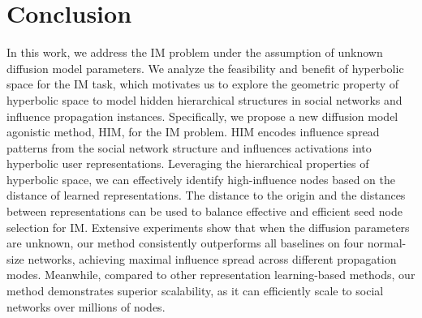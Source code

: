 \section{Conclusion}
In this work, we address the IM problem under the assumption of unknown diffusion model parameters.
We analyze the feasibility and benefit of hyperbolic space for the IM task, which motivates us to explore the geometric property of hyperbolic space to model hidden hierarchical structures in social networks and influence propagation instances. 
Specifically, we propose a new diffusion model agonistic method, HIM, for the IM problem. HIM encodes influence spread patterns from the social network structure and influences activations into hyperbolic user representations.
Leveraging the hierarchical properties of hyperbolic space, we can effectively identify high-influence nodes based on the distance of learned representations.
The distance to the origin and the distances between representations can be used to balance effective and efficient seed node selection for IM.
Extensive experiments show that when the diffusion parameters are unknown, our method consistently outperforms all baselines on four normal-size networks, achieving maximal influence spread across different propagation modes.
Meanwhile, compared to other representation learning-based methods, our method demonstrates superior scalability, as it can efficiently scale to social networks over millions of nodes.